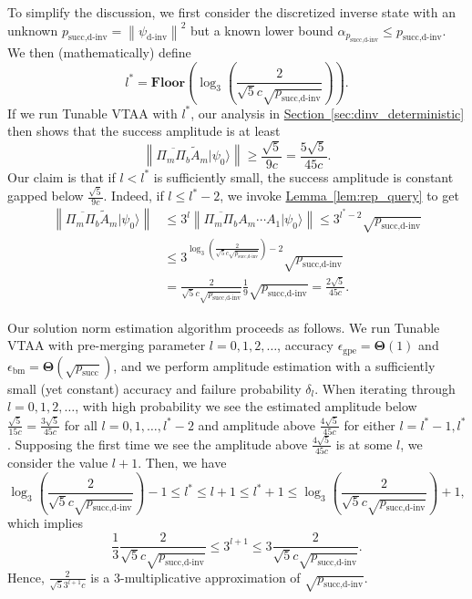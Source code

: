 \documentclass[letterpaper,onecolumn,11pt,accepted=2026-02-14]{quantumarticle}
\newcommand{\norm}[1]{\left\lVert#1\right\rVert}
\theoremstyle{remark}
\theoremstyle{plain}
\newcommand{\lem}[1]{\hyperref[lem:#1]{Lemma~\ref*{lem:#1}}}
\renewcommand{\sec}[1]{\hyperref[sec:#1]{Section~\ref*{sec:#1}}}
\newcommand{\ket}[1]{|#1\rangle}
\begin{document}
To simplify the discussion, we first consider the discretized inverse state with an unknown $p_{\text{succ,d-inv}}=\norm{\psi_{\text{d-inv}}}^2$ but a known lower bound $\alpha_{p_{\text{succ,d-inv}}}\leq p_{\text{succ,d-inv}}$. We then (mathematically) define
\begin{equation}
    l^*=\mathbf{Floor}\left(\log_3\left(\frac{2}{\sqrt{5}c\sqrt{p_{\text{succ,d-inv}}}}\right)\right).
\end{equation}
If we run Tunable VTAA with $l^*$, our analysis in \sec{dinv_deterministic} then shows that the success amplitude is at least
\begin{equation}
    \norm{\overline{\Pi_m\Pi_b}\widetilde A_m\ket{\psi_0}}
    \geq\frac{\sqrt{5}}{9c}=\frac{5\sqrt{5}}{45c}.
\end{equation}
Our claim is that if $l<l^*$ is sufficiently small, the success amplitude is constant gapped below $\frac{\sqrt{5}}{9c}$. Indeed, if $l\leq l^*-2$, we invoke \lem{rep_query} to get
\begin{equation}
\begin{aligned}
    \norm{\overline{\Pi_m\Pi_b}\widetilde A_m\ket{\psi_0}}
    &\leq 3^l\norm{\overline{\Pi_m\Pi_b} A_m\cdots A_1\ket{\psi_0}}
    \leq3^{l^*-2}\sqrt{p_{\text{succ,d-inv}}}\\
    &\leq3^{\log_3\left(\frac{2}{\sqrt{5}c\sqrt{p_{\text{succ,d-inv}}}}\right)-2}\sqrt{p_{\text{succ,d-inv}}}\\
    &=\frac{2}{\sqrt{5}c\sqrt{p_{\text{succ,d-inv}}}}\frac{1}{9}\sqrt{p_{\text{succ,d-inv}}}=\frac{2\sqrt{5}}{45c}.
\end{aligned}
\end{equation}

Our solution norm estimation algorithm proceeds as follows. We run Tunable VTAA with pre-merging parameter $l=0,1,2,\ldots$, accuracy $\epsilon_{\text{gpe}}=\mathbf{\Theta}(1)$ and $\epsilon_{\text{bm}}=\mathbf{\Theta}\left(\sqrt{p_{\text{succ}}}\right)$, and we perform amplitude estimation with a sufficiently small (yet constant) accuracy and failure probability $\delta_l$. 
When iterating through $l=0,1,2,\ldots$, with high probability we see the estimated amplitude below $\frac{\sqrt{5}}{15c}=\frac{3\sqrt{5}}{45c}$ for all $l=0,1,\ldots,l^*-2$ and amplitude above $\frac{4\sqrt{5}}{45c}$ for either $l=l^*-1,l^*$.
Supposing the first time we see the amplitude above $\frac{4\sqrt{5}}{45c}$ is at some $l$, we consider the value $l+1$. Then, we have
\begin{equation}
    \log_3\left(\frac{2}{\sqrt{5}c\sqrt{p_{\text{succ,d-inv}}}}\right)-1
    \leq l^*
    \leq l+1
    \leq l^*+1
    \leq \log_3\left(\frac{2}{\sqrt{5}c\sqrt{p_{\text{succ,d-inv}}}}\right)+1,
\end{equation}
which implies
\begin{equation}
    \frac{1}{3}\frac{2}{\sqrt{5}c\sqrt{p_{\text{succ,d-inv}}}}
    \leq3^{l+1}
    \leq3\frac{2}{\sqrt{5}c\sqrt{p_{\text{succ,d-inv}}}}.
\end{equation}
Hence, $\frac{2}{\sqrt{5}3^{l+1}c}$ is a $3$-multiplicative approximation of $\sqrt{p_{\text{succ,d-inv}}}$.
\end{document}
